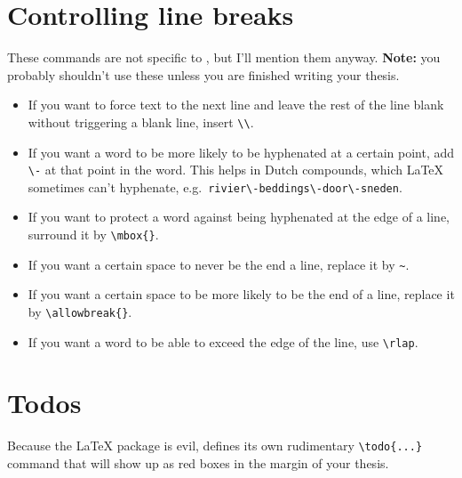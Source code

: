 \section{Controlling line breaks}
These commands are not specific to \repo, but I'll mention them anyway. \textbf{Note:} you probably shouldn't use these unless you are finished writing your thesis.
\begin{itemize}
\item If you want to force text to the next line and leave the rest of the line blank without triggering a blank line, insert \verb|\\|.
\item If you want a word to be more likely to be hyphenated at a certain point, add \verb|\-| at that point in the word. This helps in Dutch compounds, which \LaTeX{} sometimes can't hyphenate, e.g.\ \verb|rivier\-beddings\-door\-sneden|.
\item If you want to protect a word against being hyphenated at the edge of a line, surround it by \verb|\mbox{}|.
\item If you want a certain space to never be the end a line, replace it by \verb|~|.
\item If you want a certain space to be more likely to be the end of a line, replace it by \verb|\allowbreak{}|.
\item If you want a word to be able to exceed the edge of the line, use \verb|\rlap|.
\end{itemize}


\section{Todos}
Because the  \LaTeX{} package is evil, \repo defines its own rudimentary \verb|\todo{...}| command that will show up as red boxes in the margin of your thesis.
